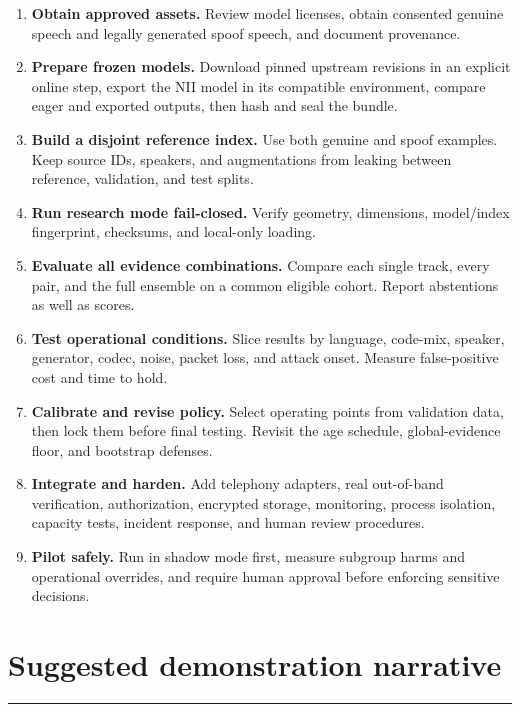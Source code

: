 \documentclass[10pt,a4paper]{article}
\newcommand{\sectionrule}{\vspace{-2mm}\textcolor{blue}{\rule{22mm}{1.2pt}}\vspace{2mm}}
\newcommand{\callout}[2]{\vspace{2mm}\noindent\fcolorbox{#1}{paper}{\parbox{0.94\linewidth}{\textbf{\textcolor{#1}{#2}}}}\vspace{2mm}}
\begin{document}
\begin{enumerate}
\item \textbf{Obtain approved assets.} Review model licenses, obtain consented genuine speech and legally generated spoof speech, and document provenance.
\item \textbf{Prepare frozen models.} Download pinned upstream revisions in an explicit online step, export the NII model in its compatible environment, compare eager and exported outputs, then hash and seal the bundle.
\item \textbf{Build a disjoint reference index.} Use both genuine and spoof examples. Keep source IDs, speakers, and augmentations from leaking between reference, validation, and test splits.
\item \textbf{Run research mode fail-closed.} Verify geometry, dimensions, model/index fingerprint, checksums, and local-only loading.
\item \textbf{Evaluate all evidence combinations.} Compare each single track, every pair, and the full ensemble on a common eligible cohort. Report abstentions as well as scores.
\item \textbf{Test operational conditions.} Slice results by language, code-mix, speaker, generator, codec, noise, packet loss, and attack onset. Measure false-positive cost and time to hold.
\item \textbf{Calibrate and revise policy.} Select operating points from validation data, then lock them before final testing. Revisit the age schedule, global-evidence floor, and bootstrap defenses.
\item \textbf{Integrate and harden.} Add telephony adapters, real out-of-band verification, authorization, encrypted storage, monitoring, process isolation, capacity tests, incident response, and human review procedures.
\item \textbf{Pilot safely.} Run in shadow mode first, measure subgroup harms and operational overrides, and require human approval before enforcing sensitive decisions.
\end{enumerate}

\callout{green}{The strongest current contribution is the end-to-end architecture and its honest uncertainty handling: streaming evidence is connected to a privacy-aware, fail-safe prevention workflow. The central remaining question is empirical---whether the research stack detects real attacks accurately and fairly enough to justify deployment.}

\section{Suggested demonstration narrative}
\sectionrule
\end{document}

